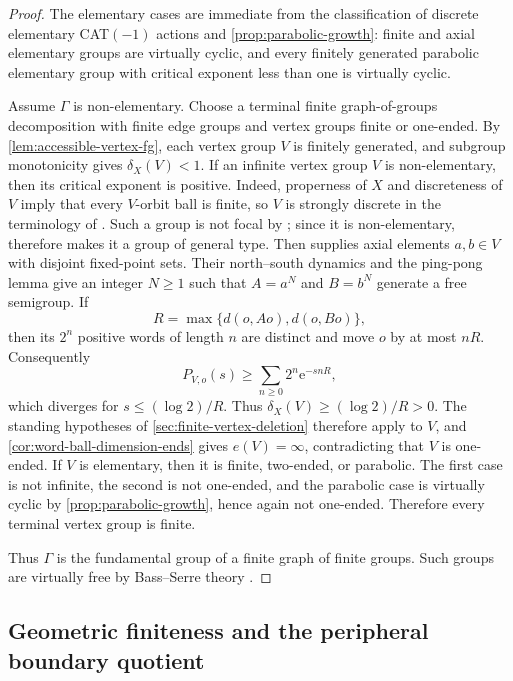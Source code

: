 \documentclass[11pt]{article}
\theoremstyle{definition}
\newcommand{\e}{\mathrm e}
\begin{document}
\begin{proof}
The elementary cases are immediate from the classification of discrete elementary CAT$(-1)$
actions and \cref{prop:parabolic-growth}: finite and axial elementary groups are virtually
cyclic, and every finitely generated parabolic elementary group with critical exponent less than one is
virtually cyclic.

Assume $\Gamma$ is non-elementary.  Choose a terminal finite graph-of-groups decomposition
with finite edge groups and vertex groups finite or one-ended.  By
\cref{lem:accessible-vertex-fg}, each vertex group $V$ is finitely generated, and subgroup
monotonicity gives $\delta_X(V)<1$.  If an infinite vertex group $V$ is non-elementary, then its critical exponent is positive.
Indeed, properness of $X$ and discreteness of $V$ imply that every $V$-orbit ball is finite,
so $V$ is strongly discrete in the terminology of
\cite[Definition~5.2.1]{DasSimmonsUrbanski2017}.  Such a group is not focal by
\cite[Proposition~6.4.1]{DasSimmonsUrbanski2017}; since it is non-elementary,
\cite[Proposition~7.3.1]{DasSimmonsUrbanski2017} therefore makes it a group of general type.
Then \cite[Proposition~7.4.7]{DasSimmonsUrbanski2017} supplies axial elements $a,b\in V$ with
disjoint fixed-point sets.  Their north--south dynamics
\cite[Theorem~6.1.10]{DasSimmonsUrbanski2017} and the ping-pong lemma give an integer
$N\ge1$ such that $A=a^N$ and $B=b^N$ generate a free semigroup.  If
\[
 R=\max\{d(o,Ao),d(o,Bo)\},
\]
then its $2^n$ positive words of length $n$ are distinct and move $o$ by at most $nR$.
Consequently
\[
 P_{V,o}(s)\ge\sum_{n\ge0}2^n\e^{-snR},
\]
which diverges for $s\le(\log2)/R$.  Thus $\delta_X(V)\ge(\log2)/R>0$.
The standing hypotheses of \cref{sec:finite-vertex-deletion} therefore apply to $V$, and
\cref{cor:word-ball-dimension-ends} gives $e(V)=\infty$, contradicting that $V$ is one-ended.  If $V$ is elementary, then it is finite, two-ended, or parabolic.  The first
case is not infinite, the second is not one-ended, and the parabolic case is virtually cyclic by
\cref{prop:parabolic-growth}, hence again not one-ended.  Therefore every terminal vertex
group is finite.

Thus $\Gamma$ is the fundamental group of a finite graph of finite groups.  Such groups are
virtually free by Bass--Serre theory \cite{KarrassPietrowskiSolitar1973,Serre2003}.
\end{proof}

\subsection{Geometric finiteness and the peripheral boundary quotient}
\end{document}
